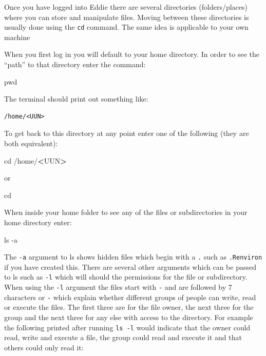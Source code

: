 \documentclass[
]{book}
\newenvironment{Shaded}{\begin{snugshade}}{\end{snugshade}}
\newcommand{\BuiltInTok}[1]{#1}
\newcommand{\FunctionTok}[1]{\textcolor[rgb]{0.00,0.00,0.00}{#1}}
\newcommand{\NormalTok}[1]{#1}
\newcommand{\OperatorTok}[1]{\textcolor[rgb]{0.81,0.36,0.00}{\textbf{#1}}}
\begin{document}
Once you have logged into Eddie there are several directories (folders/places) where you can store and manipulate files. Moving between these directories is usually done using the \texttt{cd} command. The same idea is applicable to your own machine

When you first log in you will default to your home directory. In order to see the ``path'' to that directory enter the command:

\begin{Shaded}
\begin{Highlighting}[]
\BuiltInTok{pwd}
\end{Highlighting}
\end{Shaded}

The terminal should print out something like:

\begin{verbatim}
/home/<UUN>
\end{verbatim}

To get back to this directory at any point enter one of the following (they are both equivalent):

\begin{Shaded}
\begin{Highlighting}[]
\BuiltInTok{cd}\NormalTok{ /home/}\OperatorTok{<}\NormalTok{UUN}\OperatorTok{>}
\end{Highlighting}
\end{Shaded}

or

\begin{Shaded}
\begin{Highlighting}[]
\BuiltInTok{cd}\NormalTok{ ~}
\end{Highlighting}
\end{Shaded}

When inside your home folder to see any of the files or subdirectories in your home directory enter:

\begin{Shaded}
\begin{Highlighting}[]
\FunctionTok{ls}\NormalTok{ -a}
\end{Highlighting}
\end{Shaded}

The \texttt{-a} argument to ls shows hidden files which begin with a \texttt{.} such as \texttt{.Renviron} if you have created this. There are several other arguments which can be passed to ls such as \texttt{-l} which will should the permissions for the file or subdirectory. When using the \texttt{-l} argument the files start with \texttt{-} and are followed by 7 characters or \texttt{-} which explain whether different groups of people can write, read or execute the files. The first three are for the file owner, the next three for the group and the next three for any else with access to the directory. For example the following printed after running \texttt{ls\ -l} would indicate that the owner could read, write and execute a file, the group could read and execute it and that others could only read it:
\end{document}
